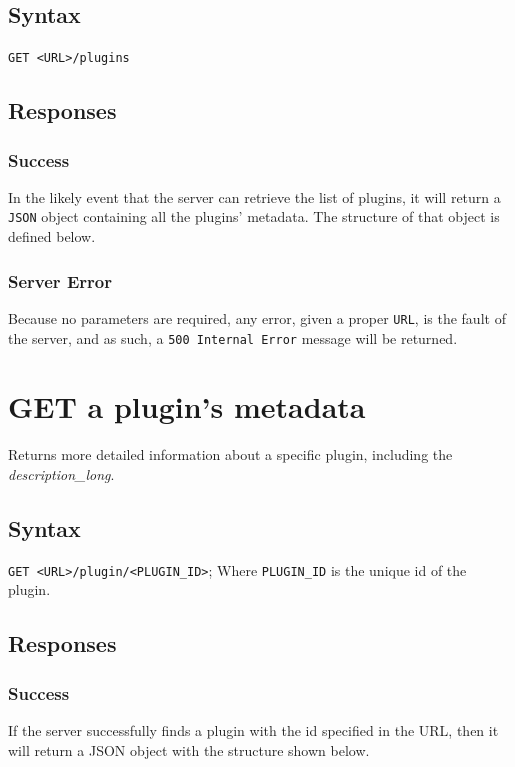 \documentclass[a4paper, 12pt]{article}
\begin{document}
		\subsection{Syntax}
			\verb|GET <URL>/plugins|

		\subsection{Responses}
			\subsubsection{Success}
				In the likely event that the server can retrieve the list of plugins, it will return a \verb|JSON| object containing all the plugins' metadata. The structure of that object is defined below.

				

			\subsubsection{Server Error}
				Because no parameters are required, any error, given a proper \verb|URL|, is the fault of the server, and as such, a \verb|500 Internal Error| message will be returned.

	\section{GET a plugin's metadata}
		Returns more detailed information about a specific plugin, including the \emph{description\_long}.

		\subsection{Syntax}
			\verb|GET <URL>/plugin/<PLUGIN_ID>|; \footnotesize{Where \verb|PLUGIN_ID| is the unique id of the plugin.}

		\subsection{Responses}
			\subsubsection{Success}
				If the server successfully finds a plugin with the id specified in the URL, then it will return a JSON object with the structure shown below.
\end{document}
